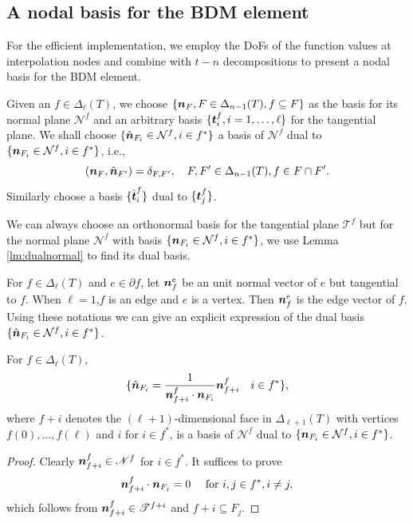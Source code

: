 \documentclass[mathpazo]{cicp}
\begin{document}
\subsection{A nodal basis for the BDM element}
For the efficient implementation, we employ the DoFs of the function values at interpolation nodes and combine with $t-n$ decompositions to present a nodal basis for the BDM element.  
 
Given an $f\in \Delta_{\ell}(T)$, we choose $\{\boldsymbol n_F, F\in \Delta_{n-1}( T), f\subseteq F\}$ as the basis for its normal plane $\mathcal N^f$ and an arbitrary basis $\{ \boldsymbol t_i^f, i=1,\ldots, \ell \}$ for the tangential plane. We shall choose  $\{\hat{\boldsymbol n}_{F_i}\in \mathcal N^f, i\in f^*\}$ a basis of $\mathcal N^f$  dual to $\{\boldsymbol n_{F_i}\in \mathcal N^f, i\in f^*\}$, i.e.,
$$
(\boldsymbol n_F, \hat{\boldsymbol n}_{F'}) = \delta_{F, F'}, \quad F, F'\in \Delta_{n-1}(T), f\in F\cap F'.
$$
Similarly  choose a basis $\{\hat{\boldsymbol t}_i^f\}$ dual to $\{\boldsymbol t_j^f\}$.  

We can always choose an orthonormal basis for the tangential plane $\mathscr T^f$ but for the normal plane $\mathscr N^f$ with basis $\{\boldsymbol n_{F_i}\in \mathcal N^f, i\in f^*\}$, we use Lemma \ref{lm:dualnormal} to find its dual basis. 

For $f\in \Delta_{\ell}(T)$ and $e\in\partial f$, let $\boldsymbol n_{f}^e$ be an unit normal vector of $e$ but tangential to $f$. When $\ell=1$,$f$ is an edge and $e$ is a vertex. Then $\boldsymbol n_{f}^e$ is the edge vector of $f$. 
Using these notations we can give an explicit expression of the dual basis $\{\hat{\boldsymbol n}_{F_i}\in \mathcal N^f, i\in f^*\}$.

\begin{lemma}\label{lm:dualnormal}
For $f\in \Delta_{\ell}(T)$, 
\begin{equation}\label{eq:dualnF}
\{\hat{\boldsymbol n}_{F_i}=\frac{1}{\boldsymbol n_{f+i}^f\cdot\boldsymbol n_{F_i}}\boldsymbol n_{f+i}^f \quad i\in f^*\},
\end{equation}
where $f+i$ denotes the $(\ell+1)$-dimensional face in $\Delta_{\ell+1}(T)$ with vertices $f(0),\dots, f(\ell)$ and $i$ for $i\in f^*$, is a basis of $\mathscr N^f$ dual to $\{\boldsymbol n_{F_i}\in \mathcal N^f, i\in f^* \}$.
\end{lemma}
\begin{proof}
Clearly $\boldsymbol n_{f+i}^f\in \mathscr N^f$ for $i\in f^*$. It suffices to prove
\begin{equation*}
 \boldsymbol n_{f+i}^f\cdot\boldsymbol n_{F_j}=0 \quad \textrm{ for } i,j\in f^*, i\neq j,
\end{equation*}
which follows from $\boldsymbol n_{f+i}^f\in\mathscr T^{f+i}$ and $f+i\subseteq F_j$.
\end{proof}
\end{document}
